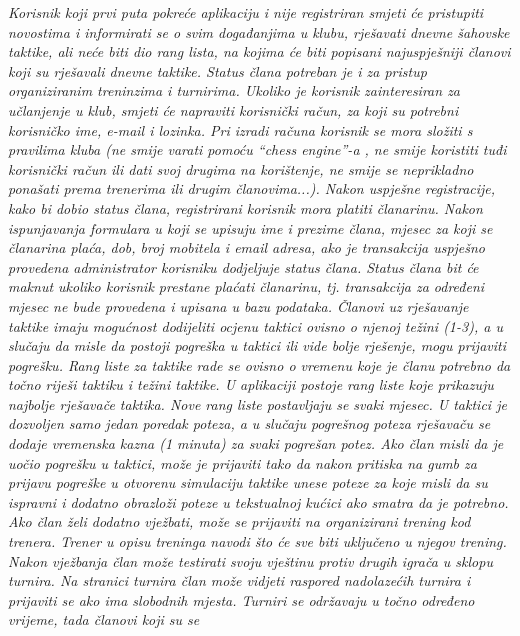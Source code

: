 		\textit{ Korisnik koji prvi puta pokreće aplikaciju i nije registriran smjeti će
			pristupiti novostima i informirati se o svim događanjima u klubu,
			rješavati dnevne šahovske taktike, ali neće biti dio rang lista, na
			kojima će biti popisani najuspješniji članovi koji su rješavali dnevne
			taktike. Status člana potreban je i za pristup organiziranim treninzima
			i turnirima. Ukoliko je korisnik zainteresiran za učlanjenje u klub,
			smjeti će napraviti korisnički račun, za koji su potrebni korisničko
			ime, e-mail i lozinka. Pri izradi računa korisnik se mora složiti s
			pravilima kluba (ne smije varati pomoću ``chess engine''-a , ne smije
			koristiti tuđi korisnički račun ili dati svoj drugima na korištenje, ne
			smije se neprikladno ponašati prema trenerima ili drugim članovima...).
			Nakon uspješne registracije, kako bi dobio status člana, registrirani
			korisnik mora platiti članarinu. Nakon ispunjavanja formulara u koji se
			upisuju ime i prezime člana, mjesec za koji se članarina plaća, dob,
			broj mobitela i email adresa, ako je transakcija uspješno provedena
			administrator korisniku dodjeljuje status člana. Status člana bit će
			maknut ukoliko korisnik prestane plaćati članarinu, tj. transakcija za
			određeni mjesec ne bude provedena i upisana u bazu podataka. Članovi uz
			rješavanje taktike imaju mogućnost dodijeliti ocjenu taktici ovisno o
			njenoj težini (1-3), a u slučaju da misle da postoji pogreška u taktici
			ili vide bolje rješenje, mogu prijaviti pogrešku. Rang liste za taktike
			rade se ovisno o vremenu koje je članu potrebno da točno riješi taktiku
			i težini taktike. U aplikaciji postoje rang liste koje prikazuju
			najbolje rješavače taktika. Nove rang liste postavljaju se svaki mjesec.
			U taktici je dozvoljen samo jedan poredak poteza, a u slučaju pogrešnog
			poteza rješavaču se dodaje vremenska kazna (1 minuta) za svaki pogrešan
			potez. Ako član misli da je uočio pogrešku u taktici, može je prijaviti
			tako da nakon pritiska na gumb za prijavu pogreške u otvorenu simulaciju
			taktike unese poteze za koje misli da su ispravni i dodatno obrazloži
			poteze u tekstualnoj kućici ako smatra da je potrebno. Ako član želi
			dodatno vježbati, može se prijaviti na organizirani trening kod trenera.
			Trener u opisu treninga navodi što će sve biti uključeno u njegov
			trening. Nakon vježbanja član može testirati svoju vještinu protiv
			drugih igrača u sklopu turnira. Na stranici turnira član može vidjeti
			raspored nadolazećih turnira i prijaviti se ako ima slobodnih mjesta.
			Turniri se održavaju u točno određeno vrijeme, tada članovi koji su se
}
